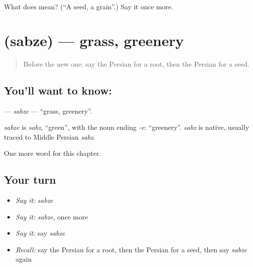 \begin{tcolorbox}[breakable,colback=teal!4,colframe=teal!35!black,title={Before you move on}]
What does  mean? (\textquotedblleft{}A seed, a grain\textquotedblright{}.) Say it once more.
\end{tcolorbox}
\section[\texorpdfstring{\fa{سبزه} (sabze)}{سبزه (sabze)}]{ (sabze) — grass, greenery}

\label{lesson:FA-C104-sabze}



\begin{quote}
Before the new one: say the Persian for a root, then the Persian for a seed.
\end{quote}

\subsection*{You'll want to know: }
\textbf{} — \emph{sabze} — \textquotedblleft{}grass, greenery\textquotedblright{}.

\begin{cousinweb}
\emph{sabze} is \emph{sabz}, \textquotedblleft{}green\textquotedblright{}, with the noun ending \emph{-e}: \textquotedblleft{}greenery\textquotedblright{}. \emph{sabz} is native, usually traced to Middle Persian \emph{sabz}.
\end{cousinweb}

\begin{grammarlens}[title={What you've built}]
One more word for this chapter.
\end{grammarlens}

\subsection*{Your turn}
\begin{itemize}
\raggedright
  \item \emph{Say it:} \emph{sabze}
  \item \emph{Say it:} \emph{sabze}, once more
  \item \emph{Say it:} say \emph{sabze}
  \item \emph{Recall:} say the Persian for a root, then the Persian for a seed, then say \emph{sabze} again
\end{itemize}

